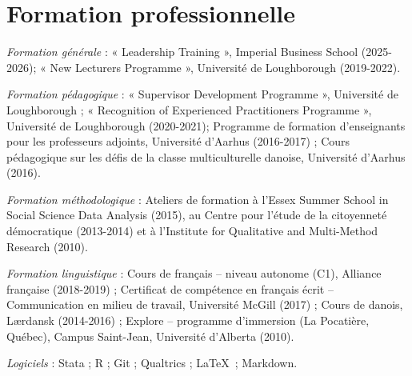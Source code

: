 \documentclass[letterpaper,fontsize=10.5pt]{scrartcl}
\begin{document}
\section{Formation professionnelle}
{}\textit{Formation générale} : « Leadership Training », Imperial Business School (2025-2026); « New Lecturers Programme », Université de Loughborough (2019-2022).\\
\hfill \break
{}
{}\textit{Formation pédagogique} : « Supervisor Development Programme », Université de Loughborough ; « Recognition of Experienced Practitioners Programme », Université de Loughborough (2020-2021); Programme de formation d'enseignants pour les professeurs adjoints, Université d'Aarhus (2016-2017) ; Cours pédagogique sur les défis de la classe multiculturelle danoise, Université d'Aarhus (2016).\\
\hfill \break
{}
{}\textit{Formation méthodologique} : Ateliers de formation à l'Essex Summer School in Social Science Data Analysis (2015), au Centre pour l’étude de la citoyenneté démocratique (2013-2014) et	à l'Institute for Qualitative and Multi-Method Research (2010).\\
\hfill \break
{}
{}\textit{Formation linguistique} : Cours de français – niveau autonome (C1), Alliance française (2018-2019) ; Certificat de compétence en français écrit – Communication en milieu de travail, Université McGill (2017) ; Cours de danois, Lærdansk (2014-2016) ; Explore – programme d'immersion (La Pocatière, Québec), Campus Saint-Jean, Université d'Alberta (2010).\\
\hfill \break
{}
{}\textit{Logiciels} : Stata ; R ; Git ; Qualtrics ; \LaTeX\ ; Markdown.

\end{document}
